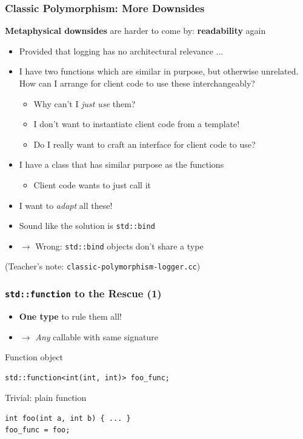 \begin{frame}
  \frametitle{Classic Polymorphism: More Downsides}

  \textbf{Metaphysical downsides} are harder to come by:
  \textbf{readability} again

  \begin{itemize}
  \item Provided that logging has no architectural relevance ...
  \item I have two functions which are similar in purpose, but
    otherwise unrelated. How can I arrange for client code to use
    these interchangeably?
    \begin{itemize}
    \item Why can't I \textit{just use} them?
    \item I don't want to instantiate client code from a template!
    \item Do I really want to craft an interface for client code to
      use?
    \end{itemize}
  \item I have a class that has similar purpose as the functions
    \begin{itemize}
    \item Client code wants to just call it
    \end{itemize}
  \item I want to \textit{adapt} all these!
  \item Sound like the solution is \texttt{std::bind}
  \item $\to$ Wrong: \texttt{std::bind} objects don't share a type
  \end{itemize}

  (Teacher's note: \texttt{classic-polymorphism-logger.cc})

\end{frame}

\begin{frame}[fragile]
  \frametitle{\texttt{std::function} to the Rescue (1)}

  \begin{itemize}
  \item \textbf{One type} to rule them all!
  \item $\to$ \textit{Any} callable with same signature
  \end{itemize}

  \begin{block}{Function object}
\begin{verbatim}
std::function<int(int, int)> foo_func;
\end{verbatim}
  \end{block}

  \begin{block}{Trivial: plain function}
\begin{verbatim}
int foo(int a, int b) { ... }
foo_func = foo;
\end{verbatim}
  \end{block}

\end{frame}

